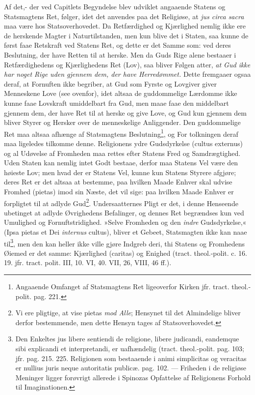 \documentclass[12pt,a4paper]{book}
\newcommand{\opage}[1]{\marginnote{\footnotesize\textit{[#1]}}}
\begin{document}
Af det,- der ved Capitlets Begyndelse blev udviklet angaaende Statens og Statsmagtens Ret, følger, idet det anvendes paa det Religiøse, at \emph{jus circa sacra} maa være hos Statsoverhovedet. Da Retfærdighed og Kjærlighed nemlig ikke ere de herskende Magter i Naturtilstanden, men kun blive det i Staten, saa kunne de først faae Retskraft ved Statens Ret, og dette er det Samme som: ved deres Beslutning, der have Retten til at herske. Men da Guds Rige alene bestaaer i Retfærdighedens og Kjærlighedens Ret (Lov), saa bliver Følgen atter, \emph{at Gud ikke har noget Rige uden gjennem dem, der have Herredømmet.} Dette fremgaaer ogsaa deraf, at Fornuften ikke begriber, at Gud som Fyrste og Lovgiver giver Menneskene Love (see ovenfor), idet altsaa de guddommelige Lærdomme ikke kunne faae Lovskraft umiddelbart fra Gud, men maae faae den middelbart gjennem dem, der have Ret til at herske og give Love, og Gud kun gjennem dem bliver Styrer og Hersker over de menneskelige Anliggender. Den guddommelige Ret maa altsaa afhænge af Statsmagtens Beslutning\footnote{Angaaende Omfanget af Statsmagtens Ret ligeoverfor Kirken jfr. tract. theol.-polit. pag. 221.}, og For\-%
\opage{160}\setcounter{footnote}{0}%
tolkningen deraf maa ligeledes tilkomme denne. Religionens ydre Gudsdyrkelse (cultus externus) og al Udøvelse af Fromheden maa rettes efter Statens Fred og Samdrægtighed. Uden Staten kan nemlig intet Godt bestaae, derfor maa Statens Vel være den høieste Lov; men hvad der er Statens Vel, kunne kun Statens Styrere afgjøre; deres Ret er det altsaa at bestemme, paa hvilken Maade Enhver skal udvise Fromhed (pietas) imod sin Næste, det vil sige: paa hvilken Maade Enhver er forpligtet til at adlyde Gud\footnote{Vi ere pligtige, at vise pietas \emph{mod Alle}; Hensynet til det Almindelige bliver derfor bestemmende, men dette Hensyn tages af Statsoverhovedet.}. Undersaatternes Pligt er det, i denne Henseende ubetinget at adlyde Øvrighedens Befalinger, og dennes Ret begrændses kun ved Umulighed og Fornuftstridighed. »Selve Fromheden og den \emph{indre} Gudsdyrkelse,« (Ipsa pietas et Dei \emph{internus} cultus), bliver et Gebeet, Statsmagten ikke kan naae til\footnote{Den Enkeltes jus libere sentiendi de religione, libere judicandi, eandemque sibi explicandi et interpretandi, er uafhændelig (tract. theol.-polit. pag. 103; jfr. pag. 215. 225. Religionen som bestaaende i animi simplicitas og veracitas er nullius juris neque autoritatis publicæ. pag. 102. --- Friheden i de religiøse Meninger ligger forøvrigt allerede i Spinozas Opfattelse af Religionens Forhold til Imaginationen.}, men den kan heller ikke ville gjøre Indgreb deri, thi Statens og Fromhedens Øiemed er det samme: Kjærlighed (caritas) og Enighed (tract. theol.-polit. c. 16. 19. jfr. tract. polit. III, 10. VI, 40. VII, 26, VIII, 46 ff.).
\end{document}
